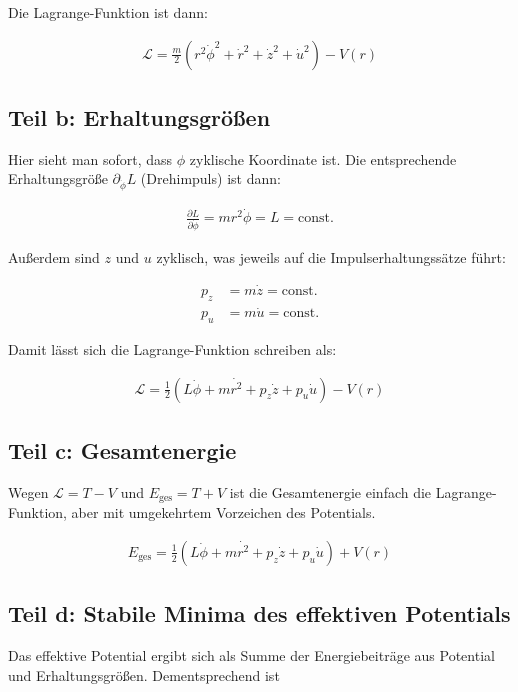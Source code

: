 \documentclass[a4paper,german,12pt,smallheadings]{scrartcl}
\begin{document}
Die Lagrange-Funktion ist dann:

\begin{align*}
  \mathcal{L} = \frac{m}{2}(r^2\dot{\phi}^2 + \dot{r}^2 + \dot{z}^2 + \dot{u}^2) - V(r)
\end{align*}

\subsection*{Teil b: Erhaltungsgrößen}

Hier sieht man sofort, dass $\phi$ zyklische Koordinate ist. Die entsprechende Erhaltungsgröße $\partial_{\dot{\phi}} L$ (Drehimpuls) ist dann:

\begin{align*}
  \frac{\partial L}{\partial \dot{\phi}} = mr^2 \dot{\phi} = L = \text{const.}
\end{align*}

Außerdem sind $z$ und $u$ zyklisch, was jeweils auf die Impulserhaltungssätze führt:

\begin{align*}
  p_z &= m\dot{z} = \text{const.} \\
  p_u &= m\dot{u} = \text{const.}
\end{align*}

Damit lässt sich die Lagrange-Funktion schreiben als:

\begin{align*}
  \mathcal{L} = \frac{1}{2}(L\dot{\phi} + m\dot{r^2} + p_z\dot{z} + p_u \dot{u}) - V(r)
\end{align*}

\subsection*{Teil c: Gesamtenergie}

Wegen $\mathcal{L} = T - V$ und $E_{\text{ges}} = T + V$ ist die Gesamtenergie
einfach die Lagrange-Funktion, aber mit umgekehrtem Vorzeichen des Potentials.

\begin{align*}
  E_{\text{ges}} = \frac{1}{2}(L\dot{\phi} + m\dot{r^2} + p_z\dot{z} + p_u \dot{u}) + V(r)
\end{align*}

\subsection*{Teil d: Stabile Minima des effektiven Potentials}
Das effektive Potential ergibt sich als Summe der Energiebeiträge aus Potential
und Erhaltungsgrößen. Dementsprechend ist
\end{document}
